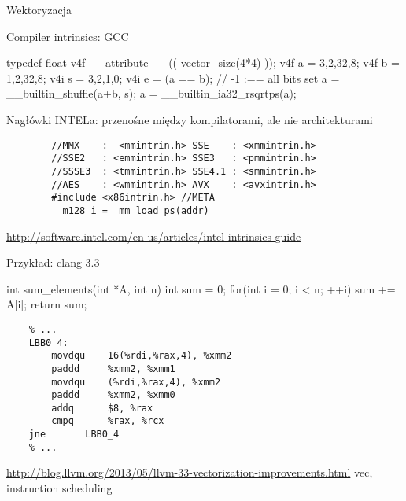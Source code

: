 \begin{frame}[fragile]{Wektoryzacja}
	\begin{block}{Compiler intrinsics: GCC}
		\begin{cpp}
			typedef float v4f __attribute__ (( vector_size(4*4) ));
			v4f a = {3,2,32,8};
			v4f b = {1,2,32,8};
			v4i s = {3,2,1,0};
			v4i e = (a == b); // -1 :== all bits set
			a = __builtin_shuffle(a+b, s);
			a = __builtin_ia32_rsqrtps(a);
		\end{cpp}
	\end{block}
	\begin{block}{Nagłówki INTELa: przenośne między kompilatorami, ale nie architekturami}
		\begin{verbatim}
		//MMX    :  <mmintrin.h> SSE    : <xmmintrin.h>
		//SSE2   : <emmintrin.h> SSE3   : <pmmintrin.h>
		//SSSE3  : <tmmintrin.h> SSE4.1 : <smmintrin.h>
		//AES    : <wmmintrin.h> AVX    : <avxintrin.h>
		#include <x86intrin.h> //META
		__m128 i = _mm_load_ps(addr)
		\end{verbatim}
		\url{http://software.intel.com/en-us/articles/intel-intrinsics-guide}
	\end{block}
\end{frame}
\begin{frame}[fragile]{Przykład: clang 3.3}
	\begin{cpp}
	int sum_elements(int *A, int n) {
	    int sum = 0;
	    for(int i = 0; i < n; ++i)
	        sum += A[i];
	    return sum;
	}
	\end{cpp}
	\begin{verbatim}
	% ...
	LBB0_4:
	    movdqu    16(%rdi,%rax,4), %xmm2
	    paddd     %xmm2, %xmm1
	    movdqu    (%rdi,%rax,4), %xmm2
	    paddd     %xmm2, %xmm0
	    addq      $8, %rax
	    cmpq      %rax, %rcx
	jne       LBB0_4
	% ...
	\end{verbatim}
	\tiny\url{http://blog.llvm.org/2013/05/llvm-33-vectorization-improvements.html}
	vec, instruction scheduling
\end{frame}
